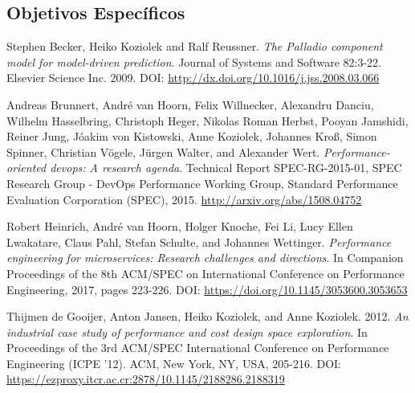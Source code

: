 \subsection{Objetivos Específicos}





\begin{thebibliography}{9}

 Stephen Becker, Heiko Koziolek and Ralf Reussner. \emph{The Palladio component model for model-driven prediction}. Journal of Systems and Software 82:3-22. Elsevier Science Inc. 2009. DOI: \url{http://dx.doi.org/10.1016/j.jss.2008.03.066}

 Andreas Brunnert, André van Hoorn, Felix Willnecker, Alexandru Danciu, Wilhelm Hasselbring, Christoph Heger, Nikolas Roman Herbst, Pooyan Jamshidi, Reiner Jung, Jóakim von Kistowski, Anne Koziolek, Johannes Kroß, Simon Spinner, Christian Vögele, Jürgen Walter, and Alexander Wert. \emph{Performance-oriented devops: A research agenda}. Technical Report SPEC-RG-2015-01, SPEC Research Group - DevOps Performance Working Group, Standard Performance Evaluation Corporation (SPEC), 2015. \url{http://arxiv.org/abs/1508.04752}

 Robert Heinrich, André van Hoorn, Holger Knoche, Fei Li, Lucy Ellen Lwakatare, Claus Pahl, Stefan Schulte, and Johannes Wettinger. \emph{Performance engineering for microservices: Research challenges and directions}. In Companion Proceedings of the 8th ACM/SPEC on International Conference on Performance Engineering, 2017, pages 223-226. DOI: \url{https://doi.org/10.1145/3053600.3053653}

 Thijmen de Gooijer, Anton Jansen, Heiko Koziolek, and Anne Koziolek. 2012. \emph{An industrial case study of performance and cost design space exploration}. In Proceedings of the 3rd ACM/SPEC International Conference on Performance Engineering (ICPE '12). ACM, New York, NY, USA, 205-216. DOI: \url{https://ezproxy.itcr.ac.cr:2878/10.1145/2188286.2188319}

\end{thebibliography}

\appendix
\section{}


